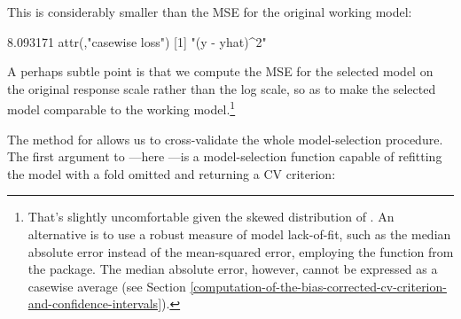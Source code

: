 \documentclass[
]{jss}
\begin{document}
This is considerably smaller than the MSE for the original working
model:

\begin{CodeChunk}
\begin{CodeOutput}
[1] 8.093171
attr(,"casewise loss")
[1] "(y - yhat)^2"
\end{CodeOutput}
\end{CodeChunk}

A perhaps subtle point is that we compute the MSE for the selected model
on the original  response scale rather than the log scale, so
as to make the selected model comparable to the working
model.\footnote{That's slightly uncomfortable given the skewed
  distribution of . An alternative is to use a robust measure
  of model lack-of-fit, such as the median absolute error instead of the
  mean-squared error, employing the  function from the
   package. The median absolute error, however, cannot be
  expressed as a casewise average (see Section
  \ref{computation-of-the-bias-corrected-cv-criterion-and-confidence-intervals}).}

The  method for  allows us to cross-validate
the whole model-selection procedure. The first argument to
---here ---is a model-selection
function capable of refitting the model with a fold omitted and
returning a CV criterion:
\end{document}
